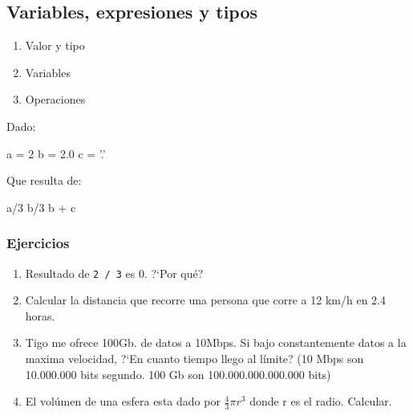 \subsection{Variables, expresiones y tipos}

\begin{frame}
    \begin{enumerate}
        \item Valor y tipo \pause
        \item Variables \pause
        \item Operaciones \pause
    \end{enumerate}
\end{frame}



\begin{frame}[fragile]
    Dado:
    \begin{python}
        a = 2
        b = 2.0
        c = '.'
    \end{python}
    Que resulta de:
    \begin{python}
        a/3
        b/3
        b + c
    \end{python}
\end{frame}

\begin{frame}
    \frametitle{Ejercicios}
    \begin{enumerate}
        \item Resultado de \texttt{2 / 3} es 0. ?`Por qu\'e?
        \item Calcular la distancia que recorre una persona que corre a 12 km/h en 2.4 horas.
        \item Tigo me ofrece 100Gb. de datos a 10Mbps. Si bajo constantemente datos a la maxima velocidad, 
            ?`En cuanto tiempo llego al l\'imite? (10 Mbps son 10.000.000 bits segundo. 100 Gb son 100.000.000.000.000 bits)
        \item El vol\'umen de una esfera esta dado por $\frac{4}{3}\pi r^3$ donde r es el radio. Calcular.
    \end{enumerate}
\end{frame}


